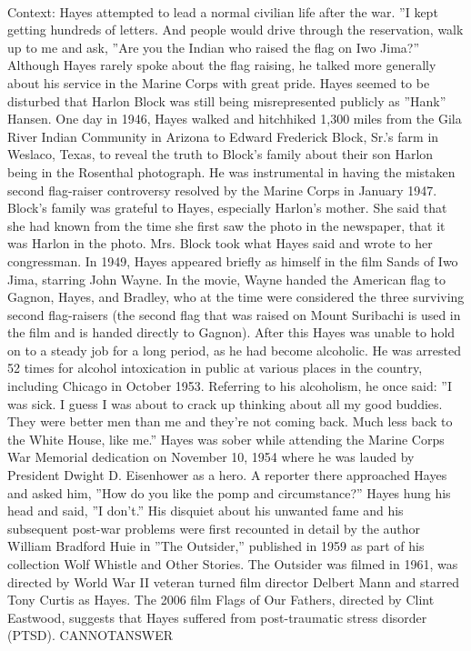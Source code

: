 \documentclass[11pt,a4paper, onecolumn]{article}
\begin{document}
\\ Context: Hayes attempted to lead a normal civilian life after the war. ''I kept getting hundreds of letters. And people would drive through the reservation, walk up to me and ask, ''Are you the Indian who raised the flag on Iwo Jima?'' Although Hayes rarely spoke about the flag raising, he talked more generally about his service in the Marine Corps with great pride. Hayes seemed to be disturbed that Harlon Block was still being misrepresented publicly as ''Hank'' Hansen. One day in 1946, Hayes walked and hitchhiked 1,300 miles from the Gila River Indian Community in Arizona to Edward Frederick Block, Sr.'s farm in Weslaco, Texas, to reveal the truth to Block's family about their son Harlon being in the Rosenthal photograph. He was instrumental in having the mistaken second flag-raiser controversy resolved by the Marine Corps in January 1947. Block's family was grateful to Hayes, especially Harlon's mother. She said that she had known from the time she first saw the photo in the newspaper, that it was Harlon in the photo. Mrs. Block took what Hayes said and wrote to her congressman. In 1949, Hayes appeared briefly as himself in the film Sands of Iwo Jima, starring John Wayne. In the movie, Wayne handed the American flag to Gagnon, Hayes, and Bradley, who at the time were considered the three surviving second flag-raisers (the second flag that was raised on Mount Suribachi is used in the film and is handed directly to Gagnon). After this Hayes was unable to hold on to a steady job for a long period, as he had become alcoholic. He was arrested 52 times for alcohol intoxication in public at various places in the country, including Chicago in October 1953. Referring to his alcoholism, he once said: ''I was sick. I guess I was about to crack up thinking about all my good buddies. They were better men than me and they're not coming back. Much less back to the White House, like me.'' Hayes was sober while attending the Marine Corps War Memorial dedication on November 10, 1954 where he was lauded by President Dwight D. Eisenhower as a hero. A reporter there approached Hayes and asked him, ''How do you like the pomp and circumstance?'' Hayes hung his head and said, ''I don't.'' His disquiet about his unwanted fame and his subsequent post-war problems were first recounted in detail by the author William Bradford Huie in ''The Outsider,'' published in 1959 as part of his collection Wolf Whistle and Other Stories. The Outsider was filmed in 1961, was directed by World War II veteran turned film director Delbert Mann and starred Tony Curtis as Hayes. The 2006 film Flags of Our Fathers, directed by Clint Eastwood, suggests that Hayes suffered from post-traumatic stress disorder (PTSD). CANNOTANSWER
\end{document}
